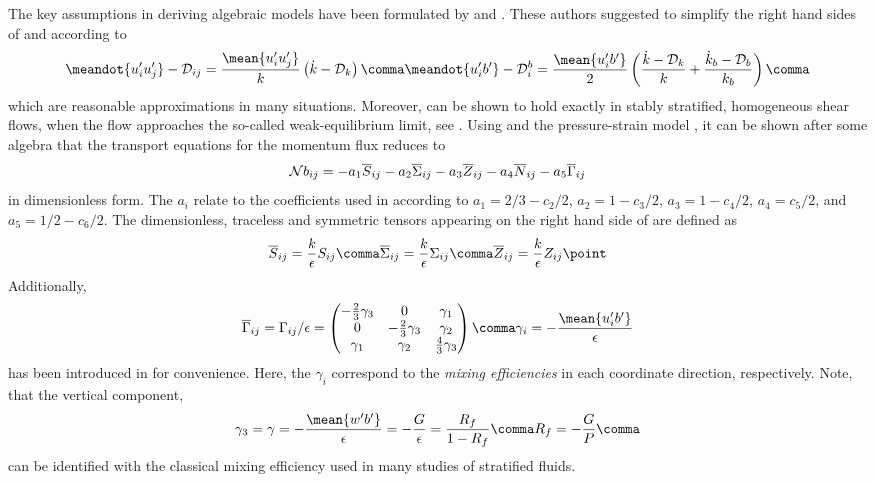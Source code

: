 The key assumptions in deriving algebraic models have been formulated by 
\cite{Rodi76} and \cite{GibsonLaunder76}. These authors suggested
to simplify the right hand sides of  and 
according to
\begin{equation}
  \label{Rodi}
    \meandot{u'_i u'_j}  - {\cal D}_{ij} = \dfrac{\mean{u'_i u'_j}}{k} 
    \left( \dot{k} - {\cal D}_k \right) \comma
    \meandot{u'_i b'} - {\cal D}^b_{i}   = \dfrac{ \mean{u'_i b'} }{2} 
    \left( \dfrac{\dot{k} - {\cal D}_k }{k} + \dfrac{\dot{k}_b - {\cal D}_b  }{k_b}  \right) 
   \comma
\end{equation}
which are reasonable approximations in many situations. Moreover, 
can be shown to hold exactly in stably stratified, homogeneous shear flows,
when the flow approaches the so-called weak-equilibrium limit, see
\cite{Shihetal2000}. Using  and the pressure-strain model
, it can be shown after some algebra that the transport equations
 for the momentum flux  reduces to
\begin{equation}
  \label{bASM} {\cal N} b_{ij} = - a_1 \overline{S}_{ij} - a_2
  \overline{\Sigma}_{ij} - a_3 \overline{Z}_{ij} - a_4
  \overline{N}_{ij} - a_5 \overline{\Gamma}_{ij}
\end{equation}
in dimensionless form. The $a_i$ relate to the coefficients used in
 according to $a_1 = 2/3 - c_2/2$, $a_2=1 - c_3/2$, 
$a_3=1 - c_4/2$, $a_4=c_5/2$, and $a_5=1/2 - c_6/2$.  
The dimensionless, traceless and symmetric tensors appearing on the right hand side of
 are defined as
\begin{equation}
  \label{Sbar}
  \overline{S}_{ij}      = \dfrac{k}{\epsilon}      S_{ij}      \comma
  \overline{\Sigma}_{ij} = \dfrac{k}{\epsilon} \Sigma_{ij}      \comma
  \overline{Z}_{ij}      = \dfrac{k}{\epsilon}      Z_{ij}      \point
\end{equation}
Additionally,
\begin{equation}
  \label{Gij}
  \overline{\Gamma}_{ij} = \Gamma_{ij} / \epsilon = 
  \begin{pmatrix}
    - \frac{2}{3} \gamma_3 &           0             &      \gamma_1           \\
            0              & - \frac{2}{3} \gamma_3  &      \gamma_2           \\
       \gamma_1            &     \gamma_2            &  \frac{4}{3} \gamma_3  \\
  \end{pmatrix}
  \comma
  \gamma_i = - \dfrac{\mean{u'_i b'}}{\epsilon}
\end{equation}
has been introduced in  for convenience. Here, the $\gamma_i$
correspond to the \emph{mixing efficiencies} in each coordinate
direction, respectively.  Note, that the vertical component,
\begin{equation}
  \label{gamma}
   \gamma_3 = \gamma  = - \dfrac{\mean{w'b'}}{\epsilon} 
  = - \dfrac{G}{\epsilon} = \dfrac{R_f}{1-R_f} \comma R_f = - \dfrac{G}{P}
  \comma
\end{equation}
can be identified with the classical mixing efficiency used in many
studies of stratified fluids.


